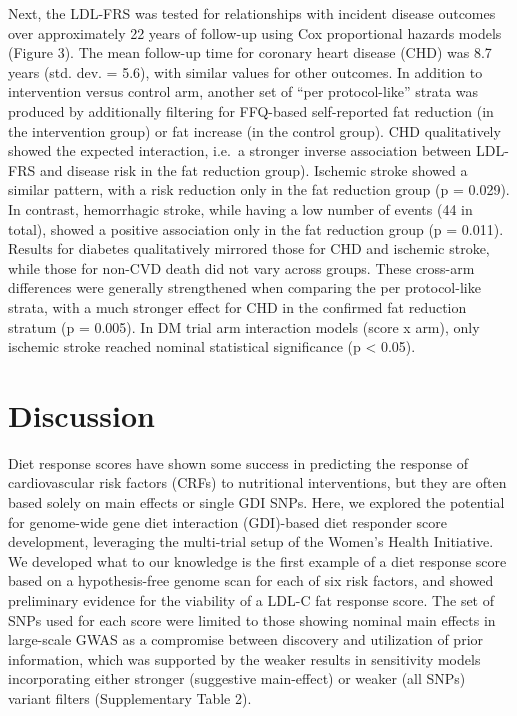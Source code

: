 \documentclass[]{article}
\begin{document}
Next, the LDL-FRS was tested for relationships with incident disease
outcomes over approximately 22 years of follow-up using Cox proportional
hazards models (Figure 3). The mean follow-up time for coronary heart
disease (CHD) was 8.7 years (std. dev. = 5.6), with similar values for
other outcomes. In addition to intervention versus control arm, another
set of ``per protocol-like'' strata was produced by additionally
filtering for FFQ-based self-reported fat reduction (in the intervention
group) or fat increase (in the control group). CHD qualitatively showed
the expected interaction, i.e.~a stronger inverse association between
LDL-FRS and disease risk in the fat reduction group). Ischemic stroke
showed a similar pattern, with a risk reduction only in the fat
reduction group (p = 0.029). In contrast, hemorrhagic stroke, while
having a low number of events (44 in total), showed a positive
association only in the fat reduction group (p = 0.011). Results for
diabetes qualitatively mirrored those for CHD and ischemic stroke, while
those for non-CVD death did not vary across groups. These cross-arm
differences were generally strengthened when comparing the per
protocol-like strata, with a much stronger effect for CHD in the
confirmed fat reduction stratum (p = 0.005). In DM trial arm interaction
models (score x arm), only ischemic stroke reached nominal statistical
significance (p \textless{} 0.05).

\hypertarget{discussion}{%
\section{Discussion}\label{discussion}}

Diet response scores have shown some success in predicting the response
of cardiovascular risk factors (CRFs) to nutritional interventions, but
they are often based solely on main effects or single GDI SNPs. Here, we
explored the potential for genome-wide gene diet interaction (GDI)-based
diet responder score development, leveraging the multi-trial setup of
the Women's Health Initiative. We developed what to our knowledge is the
first example of a diet response score based on a hypothesis-free genome
scan for each of six risk factors, and showed preliminary evidence for
the viability of a LDL-C fat response score. The set of SNPs used for
each score were limited to those showing nominal main effects in
large-scale GWAS as a compromise between discovery and utilization of
prior information, which was supported by the weaker results in
sensitivity models incorporating either stronger (suggestive
main-effect) or weaker (all SNPs) variant filters (Supplementary Table
2).
\end{document}

